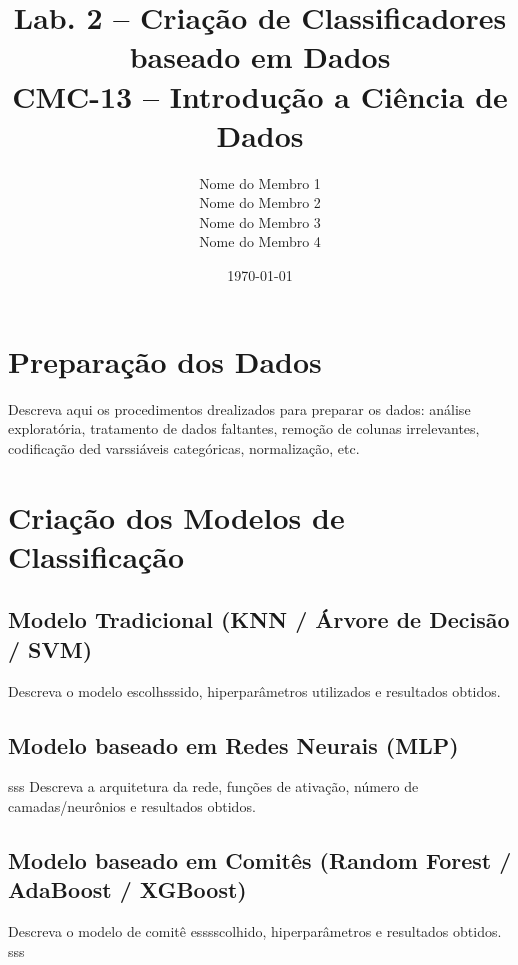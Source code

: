 \documentclass[12pt, a4paper]{article}
\title{\textbf{Lab. 2 -- Cria\c{c}\~ao de Classificadores baseado em Dados} \\[0.5cm]
\large CMC-13 -- Introdu\c{c}\~ao a Ci\^encia de Dados}
\author{
  Nome do Membro 1 \\
  Nome do Membro 2 \\
  Nome do Membro 3 \\
  Nome do Membro 4
}
\date{\today}
\begin{document}
\maketitle

\section{Prepara\c{c}\~ao dos Dados}

Descreva aqui os procedimentos drealizados para preparar os dados:
an\'alise explorat\'oria, tratamento de dados faltantes, remo\c{c}\~ao de colunas
irrelevantes, codifica\c{c}\~ao ded varssi\'aveis categ\'oricas, normaliza\c{c}\~ao, etc.


\section{Cria\c{c}\~ao dos Modelos de Classifica\c{c}\~ao}

\subsection{Modelo Tradicional (KNN / \'Arvore de Decis\~ao / SVM)}

Descreva o modelo escolhsssido, hiperpar\^ametros utilizados e resultados obtidos.

\subsection{Modelo baseado em Redes Neurais (MLP)}
sss
Descreva a arquitetura da rede, fun\c{c}\~oes de ativa\c{c}\~ao, n\'umero de camadas/neur\^onios
e resultados obtidos.

\subsection{Modelo baseado em Comit\^es (Random Forest / AdaBoost / XGBoost)}

Descreva o modelo de comit\^e esssscolhido, hiperpar\^ametros e resultados obtidos.
sss
\end{document}
